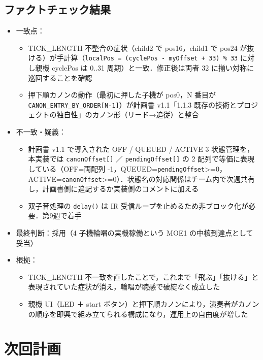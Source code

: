 \documentclass[a4paper,11pt]{ltjsarticle}
\providecommand{\％}{\%}
\begin{document}
\subsection{ファクトチェック結果}\label{sec:ai-fact}

\begin{itemize}
    \item 一致点：
    \begin{itemize}
        \item TICK\_LENGTH 不整合の症状（child2 で pos16，child1 で pos24 が抜ける）が手計算（\texttt{localPos = (cyclePos - myOffset + 33) \% 33} に対し親機 cyclePos は 0..31 周期）と一致．修正後は両者 32 に揃い対称に巡回することを確認
        \item 押下順カノンの動作（最初に押した子機が pos0，N 番目が \texttt{CANON\_ENTRY\_BY\_ORDER[N-1]}）が計画書 v1.1「1.1.3 既存の技術とプロジェクトの独自性」のカノン形（リード→追従）と整合
    \end{itemize}
    \item 不一致・疑義：
    \begin{itemize}
        \item 計画書 v1.1 で導入された OFF / QUEUED / ACTIVE 3 状態管理を，本実装では \texttt{canonOffset[]} ／ \texttt{pendingOffset[]} の 2 配列で等価に表現している（OFF=両配列 -1，QUEUED=\texttt{pendingOffset}>=0，ACTIVE=\texttt{canonOffset}>=0）．状態名の対応関係はチーム内で次週共有し，計画書側に追記するか実装側のコメントに加える
        \item 双子音処理の \texttt{delay()} は IR 受信ループを止めるため非ブロック化が必要．第9週で着手
    \end{itemize}
    \item 最終判断：採用（4 子機輪唱の実機稼働という MOE1 の中核到達点として妥当）
    \item 根拠：
    \begin{itemize}
        \item TICK\_LENGTH 不一致を直したことで，これまで「飛ぶ」「抜ける」と表現されていた症状が消え，輪唱が聴感で破綻なく成立した
        \item 親機 UI（LED ＋ start ボタン）と押下順カノンにより，演奏者がカノンの順序を即興で組み立てられる構成になり，運用上の自由度が増した
    \end{itemize}
\end{itemize}

\section{次回計画}\label{sec:next}
\end{document}
